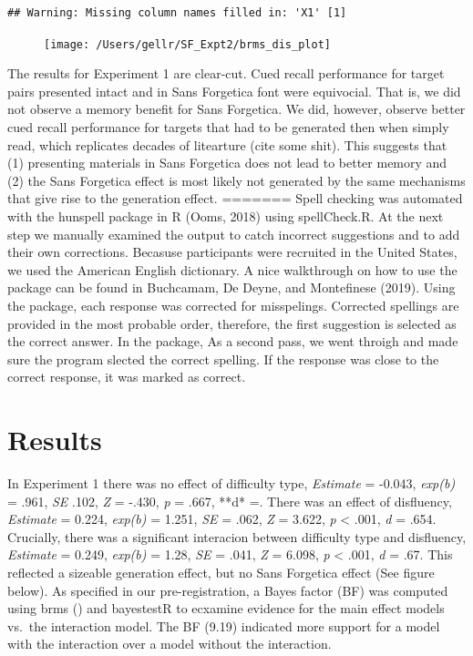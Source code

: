 \documentclass[pdf]{apa6}
\begin{document}
\begin{verbatim}
## Warning: Missing column names filled in: 'X1' [1]
\end{verbatim}

\begin{figure}

{\centering \texttt{[image: /Users/gellr/SF\_Expt2/brms\_dis\_plot]} 

}

\caption{ }\label{fig:unnamed-chunk-2}
\end{figure}

The results for Experiment 1 are clear-cut. Cued recall performance for target pairs presented intact and in Sans Forgetica font were equivocial. That is, we did not observe a memory benefit for Sans Forgetica. We did, however, observe better cued recall performance for targets that had to be generated then when simply read, which replicates decades of litearture (cite some shit). This suggests that (1) presenting materials in Sans Forgetica does not lead to better memory and (2) the Sans Forgetica effect is most likely not generated by the same mechanisms that give rise to the generation effect.
=======
Spell checking was automated with the hunspell package in R (Ooms, 2018) using spellCheck.R. At the next step we manually examined the output to catch incorrect suggestions and to add their own corrections. Becasuse participants were recruited in the United States, we used the American English dictionary. A nice walkthrough on how to use the package can be found in Buchcamam, De Deyne, and Montefinese (2019). Using the package, each response was corrected for misspelings. Corrected spellings are provided in the most probable order, therefore, the first suggestion is selected as the correct answer. In the package, As a second pass, we went throigh and made sure the program slected the correct
spelling. If the response was close to the correct response, it was marked as correct.

\hypertarget{results}{%
\section{Results}\label{results}}

In Experiment 1 there was no effect of difficulty type, \emph{Estimate} = -0.043, \emph{exp(b)} = .961, \emph{SE} .102, \emph{Z} = -.430, \emph{p} = .667, **d* =. There was an effect of disfluency, \emph{Estimate} = 0.224, \emph{exp(b)} = 1.251, \emph{SE} = .062, \emph{Z} = 3.622, \emph{p} \textless{} .001, \emph{d} = .654. Crucially, there was a significant interacion between difficulty type and disfluency, \emph{Estimate} = 0.249, \emph{exp(b)} = 1.28, \emph{SE} = .041, \emph{Z} = 6.098, \emph{p} \textless{} .001, \emph{d} = .67. This reflected a sizeable generation effect, but no Sans Forgetica effect (See figure below). As specified in our pre-registration, a Bayes factor (BF) was computed using brms () and bayestestR to ecxamine evidence for the main effect models vs.~the interaction model. The BF (9.19) indicated more support for a model with the interaction over a model without the interaction.
\end{document}
